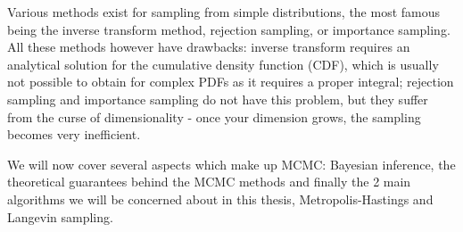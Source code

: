 \documentclass[12pt]{memoir}
\begin{document}
Various methods exist for sampling from simple distributions, the most famous being the inverse transform method, rejection sampling, or importance sampling. All these methods however have drawbacks: inverse transform requires an analytical solution for the cumulative density function (CDF), which is usually not possible to obtain for complex PDFs as it requires a proper integral; rejection sampling and importance sampling do not have this problem, but they suffer from the curse of dimensionality - once your dimension grows, the sampling becomes very inefficient.\medskip

We will now cover several aspects which make up MCMC: Bayesian inference, the theoretical guarantees behind the MCMC methods and finally the 2 main algorithms we will be concerned about in this thesis, Metropolis-Hastings and Langevin sampling.
\end{document}
